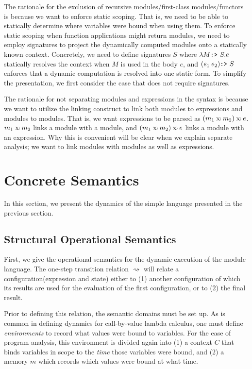 \documentclass[acmsmall,review]{acmart}\settopmatter{printfolios=true,printccs=false,printacmref=false}
\theoremstyle{definition}
\newcommand*{\mem}{m}
\newcommand*{\semarrow}{\rightsquigarrow}
\newcommand*{\semlink}{\mathbin{\rotatebox[origin=c]{180}{$\propto$}}}
\newcommand*{\link}[2]{{#1}\semlink{#2}}
\newcommand*{\project}{\text{\texttt{:>} }}
\begin{document}
The rationale for the exclusion of recursive modules/first-class modules/functors is because we want to enforce static scoping.
That is, we need to be able to statically determine where variables were bound when using them.
To enforce static scoping when function applications might return modules, we need to employ signatures to project the dynamically computed modules onto a statically known context.
Concretely, we need to define signatures $S$ where $\lambda M\project S.e$ statically resolves the context when $M$ is used in the body $e$, and $(e_1\:e_2)\project S$ enforces that a dynamic computation is resolved into one static form.
To simplify the presentation, we first consider the case that does not require signatures.

The rationale for not separating modules and expressions in the syntax is because we want to utilize the linking construct to link both modules to expressions and modules to modules.
That is, we want expressions to be parsed as $\link{(\link{m_1}{m_2})}{e}$.
$\link{m_1}{m_2}$ links a module with a module, and $\link{(\link{m_1}{m_2})}{e}$ links a module with an expression.
Why this is convenient will be clear when we explain separate analysis; we want to link modules with modules as well as expressions.

\section{Concrete Semantics}

In this section, we present the dynamics of the simple language presented in the previous section.

\subsection{Structural Operational Semantics}

First, we give the operational semantics for the dynamic execution of the module language.
The one-step transition relation $\semarrow$ will relate a configuration(expression and state) either to (1) another configuration of which its results are used for the evaluation of the first configuration, or to (2) the final result.

Prior to defining this relation, the semantic domains must be set up.
As is common in defining dynamics for call-by-value lambda calculus, one must define \emph{environments} to record what values were bound to variables.
For the ease of program analysis, this environment is divided again into (1) a context $C$ that binds variables in scope to the \emph{time} those variables were bound, and (2) a memory $\mem$ which records which values were bound at what time.
\end{document}
